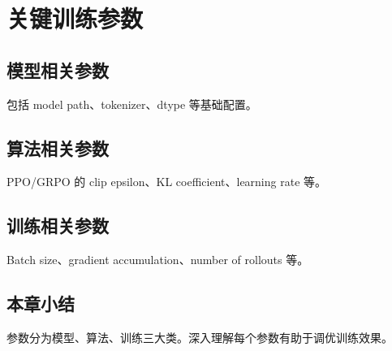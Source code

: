 \section{关键训练参数}
\subsection{模型相关参数}
包括 model path、tokenizer、dtype 等基础配置。

\subsection{算法相关参数}
PPO/GRPO 的 clip epsilon、KL coefficient、learning rate 等。

\subsection{训练相关参数}
Batch size、gradient accumulation、number of rollouts 等。

\subsection{本章小结}
参数分为模型、算法、训练三大类。深入理解每个参数有助于调优训练效果。

\newpage
